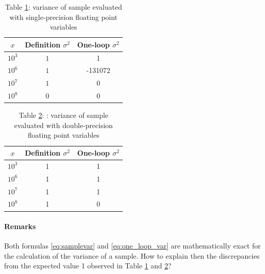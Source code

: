 \documentclass[a4paper,11]{article}
\begin{document}
\begin{table}[ht]
	\centering
	\begin{tabular}{c|c|c}
		$x$ & Definition $\sigma^{2}$ & One-loop $\sigma^{2}$ \\
		\hline
		$10^{3}$ & $1$ & 1 \\
		$10^{6}$ & $1$ & -131072 \\
		$10^{7}$ & $1$ & 0 \\
		$10^{8}$ & $0$ & 0 
	\end{tabular}
	\caption{Table \ref{table:variance_float}: variance of sample 
	evaluated with single-precision floating point variables}
	\label{table:variance_float}
\end{table}

\begin{table}[ht]
	\centering
	\begin{tabular}{c|c|c}
		$x$ & Definition $\sigma^{2}$ & One-loop $\sigma^{2}$ \\
		\hline
		$10^{3}$ & 1 & 1 \\
		$10^{6}$ & 1 & 1 \\
		$10^{7}$ & 1 & 1 \\
		$10^{8}$ & 1 & 0
	\end{tabular}
	\caption{Table \ref{table:variance_double}: : variance of sample 
	evaluated with double-precision floating point variables}
	\label{table:variance_double}
\end{table}

\paragraph{Remarks}

Both formulas \ref{eq:samplevar} and \ref{eq:one_loop_var} are 
mathematically exact for the calculation of the variance of a sample. 
How to explain then the discrepancies from the expected value 1 observed 
in Table \ref{table:variance_float} and \ref{table:variance_double}?
\end{document}
